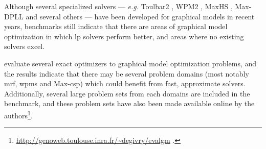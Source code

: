 Although several specialized solvers --- \emph{e.g.} Toulbar2 \parencite{Allouche10}, WPM2 \parencite{Ansotegui13b}, MaxHS \parencite{Davies13}, Max-DPLL \parencite{Larrosa08} and several others --- have been developed for graphical models in recent years, benchmarks still indicate that there are areas of graphical model optimization in which \gls{lp} solvers perform better, and areas where no existing solvers excel.

\Textcites{Allouche14b}{deGivry14} evaluate several exact optimizers to graphical model optimization problems, and the results indicate that there may be several problem domains (most notably \acrshort{mrf}, \acrshort{wpms} and Max-\acrshort{csp}) which could benefit from fast, approximate solvers.
Additionally, several large problem sets from each domains are included in the benchmark, and these problem sets have also been made available online by the authors\footnote{\url{http://genoweb.toulouse.inra.fr/~degivry/evalgm} \parencite[\pno~7]{Allouche14b}.}.
